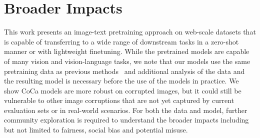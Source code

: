 \section{Broader Impacts}
This work presents an image-text pretraining approach on web-scale datasets that is capable of transferring to a wide range of downstream tasks in a zero-shot manner or with lightweight finetuning. While the pretrained models are capable of many vision and vision-language tasks, we note that our models use the same pretraining data as previous methods~\cite{jia2021scaling, zhai2021scaling, zhai2021lit, pham2021combined} and additional analysis of the data and the resulting model is necessary before the use of the models in practice. We show CoCa models are more robust on corrupted images, but it could still be vulnerable to other image corruptions that are not yet captured by current evaluation sets or in real-world scenarios. For both the data and model, further community exploration is required to understand the broader impacts including but not limited to fairness, social bias and potential misuse. 